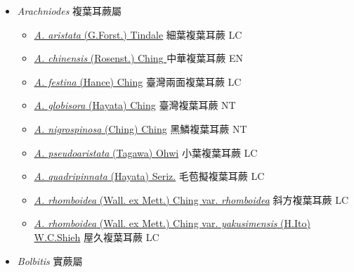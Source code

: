 
  \begin{itemize}
 \item[    ] \textit{Arachniodes} 複葉耳蕨屬
                                
  \begin{itemize}
        \item[] \href{http://www.theplantlist.org/tpl1.1/search?q=Arachniodes+aristata}{\textit{A. aristata} (G.Forst.) Tindale}   細葉複葉耳蕨   LC
        \item[] \href{http://www.theplantlist.org/tpl1.1/search?q=Arachniodes+chinensis}{\textit{A. chinensis} (Rosenst.) Ching }   中華複葉耳蕨   EN
        \item[] \href{http://www.theplantlist.org/tpl1.1/search?q=Arachniodes+festina}{\textit{A. festina} (Hance) Ching}   臺灣兩面複葉耳蕨   LC
        \item[] \href{http://www.theplantlist.org/tpl1.1/search?q=Arachniodes+globisora}{\textit{A. globisora} (Hayata) Ching}   臺灣複葉耳蕨   NT
        \item[] \href{http://www.theplantlist.org/tpl1.1/search?q=Arachniodes+nigrospinosa}{\textit{A. nigrospinosa} (Ching) Ching}   黑鱗複葉耳蕨   NT
        \item[] \href{http://www.theplantlist.org/tpl1.1/search?q=Arachniodes+pseudoaristata}{\textit{A. pseudoaristata} (Tagawa) Ohwi}   小葉複葉耳蕨   LC
        \item[] \href{http://www.theplantlist.org/tpl1.1/search?q=Arachniodes+quadripinnata}{\textit{A. quadripinnata} (Hayata) Seriz.}   毛苞擬複葉耳蕨   LC
        \item[] \href{http://www.theplantlist.org/tpl1.1/search?q=Arachniodes+rhomboidea+var.+rhomboidea}{\textit{A. rhomboidea} (Wall. ex Mett.) Ching var. \textit{rhomboidea}}  
                                        斜方複葉耳蕨   LC
        \item[] \href{http://www.theplantlist.org/tpl1.1/search?q=Arachniodes+rhomboidea+var.+yakusimensis}{\textit{A. rhomboidea} (Wall. ex Mett.) Ching var. \textit{yakusimensis} (H.Ito) W.C.Shieh}  
                                        屋久複葉耳蕨   LC
  \end{itemize}
 \item[    ] \textit{Bolbitis} 實蕨屬
                                

\end{itemize}
